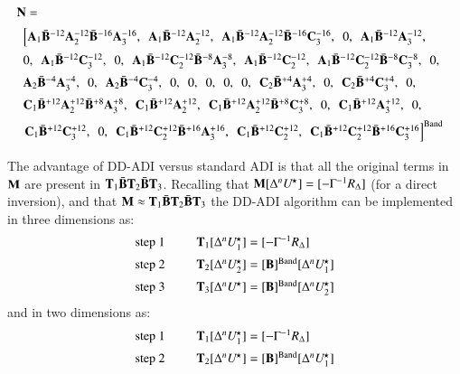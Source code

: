 \documentclass{warpdoc}
\newcommand{\alb}{\vspace{0.2cm}\\} %
\newcommand{\M}{{\bf M}}
\newcommand{\N}{{\bf N}}
\newcommand{\B}{{\bf B}}
\newcommand{\BI}{\wbar{{\bf B}}}
\newcommand{\A}{{\bf A}}
\newcommand{\C}{{\bf C}}
\newcommand{\T}{{\bf T}}
\newcommand{\Ustar}{U^{\!\star}}
\newcommand{\co}{,~~}
\newcommand{\band}{{\rm Band}}
\begin{document}
\begin{displaymath}
\begin{array}{l}
\N=  \alb
  \begin{array}{l}
   \left[
   \A_1 \BI^{-12}\A_2^{-12} \BI^{-16} \A_3^{-16}\co
   \A_1 \BI^{-12}\A_2^{-12}\co
   \A_1 \BI^{-12}\A_2^{-12} \BI^{-16} \C_3^{-16}\co
   0\co
   \A_1 \BI^{-12} \A_3^{-12}\co \right. \alb
   0 \co
   \A_1 \BI^{-12} \C_3^{-12}\co
   0\co
   \A_1 \BI^{-12}\C_2^{-12} \BI^{-8} \A_3^{-8}\co
   \A_1 \BI^{-12}\C_2^{-12}\co
   \A_1 \BI^{-12}\C_2^{-12} \BI^{-8} \C_3^{-8}\co
   0\co \alb
   \A_2 \BI^{-4} \A_3^{-4}\co
   0\co
   \A_2 \BI^{-4} \C_3^{-4}\co
   0\co
   0\co
   0\co
   0\co
   0\co
   \C_2 \BI^{+4} \A_3^{+4}\co
   0\co
   \C_2 \BI^{+4} \C_3^{+4}\co
   0\co\alb


   \C_1 \BI^{+12}\A_2^{+12} \BI^{+8} \A_3^{+8}\co
   \C_1 \BI^{+12}\A_2^{+12}\co
   \C_1 \BI^{+12}\A_2^{+12} \BI^{+8} \C_3^{+8}\co
   0\co
   \C_1 \BI^{+12} \A_3^{+12}\co
   0\co\alb
   \left.
   \C_1 \BI^{+12} \C_3^{+12}\co
   0\co
   \C_1 \BI^{+12}\C_2^{+12} \BI^{+16} \A_3^{+16}\co
   \C_1 \BI^{+12}\C_2^{+12}\co
   \C_1 \BI^{+12}\C_2^{+12} \BI^{+16} \C_3^{+16}
   \right]^\band\alb
  \end{array}
\end{array}
\end{displaymath}
%
The advantage of DD-ADI versus standard ADI is that all the original terms in
$\M$ are present in $\T_1 \BI \T_2 \BI \T_3$.
Recalling that $\M [ \Delta^n \Ustar ] = [- \Gamma^{-1} R_{\Delta}]$ (for a direct inversion),
and that $\M \approx \T_1 \BI \T_2 \BI \T_3$
the DD-ADI algorithm can be implemented in three dimensions as:
%
\begin{displaymath}
\begin{array}{rcl}
  {\rm step~1} & ~~ & \T_1 [\Delta^n \Ustar_1] = [- \Gamma^{-1} R_{\Delta}]\alb
  {\rm step~2} & ~~ & \T_2 [\Delta^n \Ustar_2] = [\B]^\band [\Delta^n \Ustar_1] \alb
  {\rm step~3} & ~~ & \T_3 [\Delta^n \Ustar] = [\B]^\band [\Delta^n \Ustar_2]
\end{array}
\end{displaymath}
%
and in two dimensions as:
%
\begin{displaymath}
\begin{array}{rcl}
  {\rm step~1} & ~~ & \T_1 [\Delta^n \Ustar_1] = [- \Gamma^{-1} R_{\Delta}]\alb
  {\rm step~2} & ~~ & \T_2 [\Delta^n \Ustar] = [\B]^\band [\Delta^n \Ustar_1] \alb
\end{array}
\end{displaymath}
%
\end{document}
